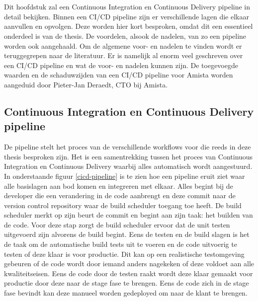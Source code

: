 
\chapter{}
\label{ch:cicd-pipeline}
Dit hoofdstuk zal een Continuous Integration en Continuous Delivery pipeline in detail bekijken. Binnen een CI/CD pipeline zijn er verschillende lagen die elkaar aanvullen en opvolgen. Deze worden hier kort besproken, omdat dit een essentieel onderdeel is van de thesis. De voordelen, alsook de nadelen, van zo een pipeline worden ook aangehaald. Om de algemene voor- en nadelen te vinden wordt er teruggegrepen naar de literatuur. Er is namelijk al enorm veel geschreven over een CI/CD pipeline en wat de voor- en nadelen kunnen zijn. De toegevoegde waarden en de schaduwzijden van een CI/CD pipeline voor Amista worden aangeduid door Pieter-Jan Deraedt, CTO bij Amista.

    \section{Continuous Integration en Continuous Delivery pipeline}
    De pipeline stelt het proces van de verschillende workflows voor die reeds in deze thesis besproken zijn. Het is een samentrekking tussen het proces van Continuous Integration en Continuous Delivery waarbij alles automatisch wordt aangestuurd. In onderstaande figuur \ref{cicd-pipeline} is te zien hoe een pipeline eruit ziet waar alle basislagen aan bod komen en integreren met elkaar.
    Alles begint bij de developer die een verandering in de code aanbrengt en deze commit naar de version control repository waar de build scheduler toegang toe heeft. De build scheduler merkt op zijn beurt de commit en begint aan zijn taak: het builden van de code. Voor deze stap zorgt de build scheduler ervoor dat de unit testen uitgevoerd zijn alvorens de build begint. Eens de testen en de build slagen is het de taak om de automatische build tests uit te voeren en de code uitvoerig te testen of deze klaar is voor productie. Dit kan op een realistische testomgeving gebeuren of de code wordt door iemand anders nagekeken of deze voldoet aan alle kwaliteitseisen. Eens de code door de testen raakt wordt deze klaar gemaakt voor productie door deze naar de stage fase te brengen. Eens de code zich in de stage fase bevindt kan deze manueel worden gedeployed om naar de klant te brengen.
    
